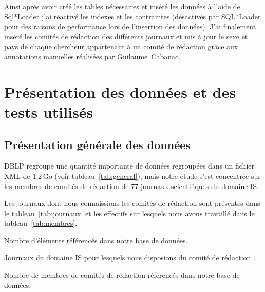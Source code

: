 		 Ainsi après avoir créé les tables nécessaires et inséré les données à l'aide de Sql*Loader j'ai réactivé les indexes et les contraintes (désactivés par SQL*Loader pour des raisons de performance lors de l'insertion des données). J'ai finalement inséré les comités de rédaction des différents journaux et mis à jour le sexe et pays de chaque chercheur appartenant à un comité de rédaction grâce aux annotations manuelles réalisées par Guilaume~Cabanac.
	
		
	\section{Présentation des données et des tests utilisés}
		
		\subsection{Présentation générale des données}
			DBLP regroupe une quantité importante de données regroupées dans un fichier XML de 1,2\,Go (voir tableau~\ref{tab:general}), mais notre étude s'est concentrée sur les membres de comités de rédaction de 77 journaux scientifiques du domaine IS.
			
			Les journaux dont nous connaissions les comités de rédaction sont présentés dans le tableau~\ref{tab:journaux} et les effectifs sur lesquels nous avons travaillé dans le tableau~\ref{tab:membres}.
		
			\begin{table}[h]
				\centering
				\caption{Nombre d'éléments référencés dans notre base de données.}\label{tab:general}
				
			\end{table}
		
			\begin{table}[p]
				\centering
				\caption{Journaux du domaine IS pour lesquels nous disposions du comité de rédaction \citep{shaping}.}\label{tab:journaux}
				
			\end{table}
		
			\begin{table}[h]
				\centering
				\caption{Nombre de membres de comités de rédaction référencés dans notre base de données.}\label{tab:membres}
				
			\end{table}
			
